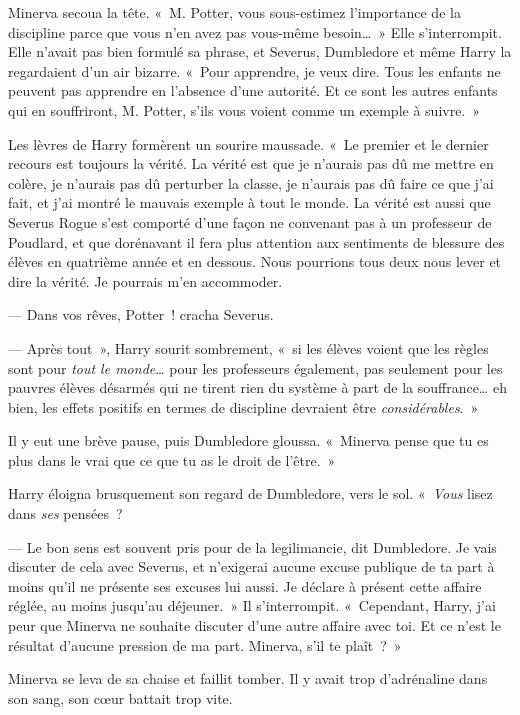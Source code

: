 Minerva secoua la tête.
«~M. Potter, vous sous-estimez l'importance de la discipline parce que vous n'en avez pas vous-même besoin…~»
Elle s'interrompit.
Elle n'avait pas bien formulé sa phrase, et Severus, Dumbledore et même Harry la regardaient d'un air bizarre.
«~Pour apprendre, je veux dire.
Tous les enfants ne peuvent pas apprendre en l'absence d'une autorité.
Et ce sont les autres enfants qui en souffriront, M. Potter, s'ils vous voient comme un exemple à suivre.~»

Les lèvres de Harry formèrent un sourire maussade.
«~Le premier et le dernier recours est toujours la vérité.
La vérité est que je n'aurais pas dû me mettre en colère, je n'aurais pas dû perturber la classe, je n'aurais pas dû faire ce que j'ai fait, et j'ai montré le mauvais exemple à tout le monde.
La vérité est aussi que Severus Rogue s'est comporté d'une façon ne convenant pas à un professeur de Poudlard, et que dorénavant il fera plus attention aux sentiments de blessure des élèves en quatrième année et en dessous.
Nous pourrions tous deux nous lever et dire la vérité.
Je pourrais m'en accommoder.

--- Dans vos rêves, Potter~! cracha Severus.

--- Après tout~», Harry sourit sombrement, «~si les élèves voient que les règles sont pour \emph{tout le monde}… pour les professeurs également, pas seulement pour les pauvres élèves désarmés qui ne tirent rien du système à part de la souffrance… eh bien, les effets positifs en termes de discipline devraient être \emph{considérables}.~»

Il y eut une brève pause, puis Dumbledore gloussa.
«~Minerva pense que tu es plus dans le vrai que ce que tu as le droit de l'être.~»

Harry éloigna brusquement son regard de Dumbledore, vers le sol.
«~\emph{Vous} lisez dans \emph{ses} pensées~?

--- Le bon sens est souvent pris pour de la legilimancie, dit Dumbledore.
Je vais discuter de cela avec Severus, et n'exigerai aucune excuse publique de ta part à moins qu'il ne présente ses excuses lui aussi.
Je déclare à présent cette affaire réglée, au moins jusqu'au déjeuner.~»
Il s'interrompit.
«~Cependant, Harry, j'ai peur que Minerva ne souhaite discuter d'une autre affaire avec toi.
Et ce n'est le résultat d'aucune pression de ma part.
Minerva, s'il te plaît~?~»

Minerva se leva de sa chaise et faillit tomber.
Il y avait trop d'adrénaline dans son sang, son cœur battait trop vite.

